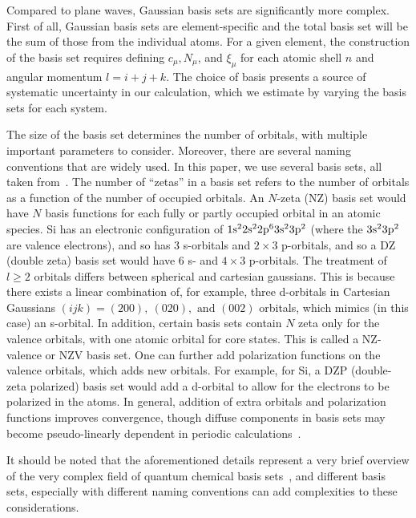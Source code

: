 \documentclass[
    prd, twocolumn, superscriptaddress, nofootinbib, amsmath, amssymb,
    aps, floatfix,preprintnumbers
]{revtex4-2}
\begin{document}
        Compared to plane waves, Gaussian basis sets are significantly more complex. First of all, Gaussian basis sets are element-specific and the total basis set will be the sum of those from the individual atoms. For a given element, the construction of the basis set requires defining $c_\mu, N_\mu$, and $\xi_\mu$ for each atomic shell $n$ and angular momentum $l = i + j+ k$. The choice of basis presents a source of systematic uncertainty in our calculation, which we estimate by varying the basis sets for each system.
        
        The size of the basis set determines the number of orbitals, with multiple important parameters to consider. Moreover, there are several naming conventions that are widely used. In this paper, we use several basis sets, all taken from~\cite{BasisSetExchange}. The number of ``zetas'' in a basis set refers to the number of orbitals as a function of the number of occupied orbitals. An $N$-zeta (NZ) basis set would have $N$ basis functions for each fully or partly occupied orbital in an atomic species. Si has an electronic configuration of $\rm 1s^2 2s^2 2p^6 3s^2 3p^2$ (where the $\rm 3s^23p^2$ are valence electrons), and so has 3 s-orbitals and $2\times3$ p-orbitals, and so a DZ (double zeta) basis set would have 6 s- and $4\times3$ p-orbitals. The treatment of $l\geq2$ orbitals differs between spherical and cartesian gaussians. This is because there exists a linear combination of, for example, three d-orbitals in Cartesian Gaussians $(ijk) = (200),\ (020), \text{ and }(002)$ orbitals, which mimics (in this case) an s-orbital. In addition, certain basis sets contain $N$ zeta only for the valence orbitals, with one atomic orbital for core states. This is called a NZ-valence or NZV basis set. One can further add polarization functions on the valence orbitals, which adds new orbitals. For example, for Si, a DZP (double-zeta polarized) basis set would add a d-orbital to allow for the electrons to be polarized in the atoms.
        In general, addition of extra orbitals and polarization functions improves convergence, though diffuse components in basis sets may become pseudo-linearly dependent in periodic calculations~\cite{PySCF2018, PySCF2020}. 
        
        It should be noted that the aforementioned details represent a very brief overview of the very complex field of quantum chemical basis sets~\cite{Dunning89}, and different basis sets, especially with different naming conventions can add complexities to these considerations.
\end{document}
